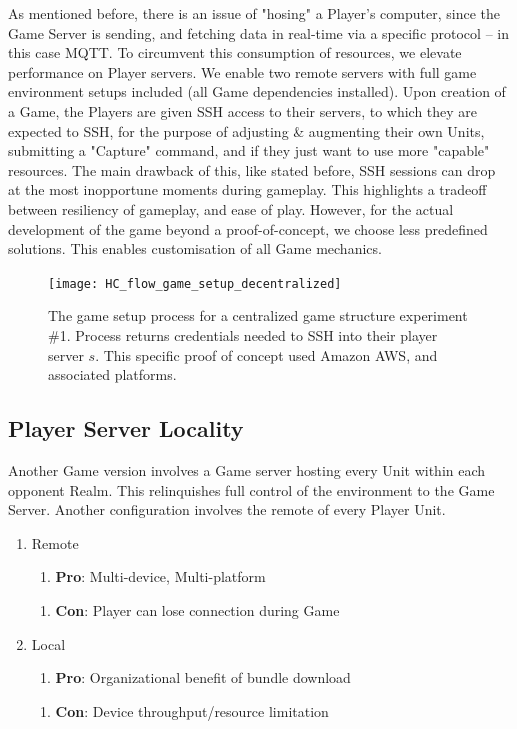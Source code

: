 \documentclass[10pt, titlepage, twocolumn]{article}
\newcommand{\ii}{\indent\indent}
\begin{document}
As mentioned before, there is an issue of "hosing" a Player's computer, since the Game Server is sending, and fetching data in real-time via a specific protocol -- in this case MQTT. To circumvent this consumption of resources, we elevate performance on Player servers. We enable two remote servers with full game environment setups included (all Game dependencies installed). Upon creation of a Game, the Players are given SSH access to their servers, to which they are expected to SSH, for the purpose of adjusting \& augmenting their own Units, submitting a "Capture" command, and if they just want to use more "capable" resources. The main drawback of this, like stated before, SSH sessions can drop at the most inopportune moments during gameplay. This highlights a tradeoff between resiliency of gameplay, and ease of play. However, for the actual development of the game beyond a proof-of-concept, we choose less predefined solutions. This enables customisation of all Game mechanics. 



\begin{figure}[ht]
\centering
	\texttt{[image: HC\_flow\_game\_setup\_decentralized]}
	\caption{The game setup process for a centralized game structure experiment \#1. Process returns credentials needed to SSH into their player server \(s\). This specific proof of concept used Amazon AWS, and associated platforms.}
	\label{decentralized}
\end{figure}



\subsection{Player Server Locality}
\ii
Another Game version involves a Game server hosting every Unit within each opponent Realm. This relinquishes full control of the environment to the Game Server. Another configuration involves the remote of every Player Unit.


\begin{enumerate}
	\item Remote
	\begin{enumerate}
		\item \textbf{Pro}: Multi-device, Multi-platform
	\end{enumerate}
	\begin{enumerate}
		\item \textbf{Con}: Player can lose connection during Game
	\end{enumerate}
	\item Local
	\begin{enumerate}
		\item \textbf{Pro}: Organizational benefit of bundle download
	\end{enumerate}
	\begin{enumerate}
		\item \textbf{Con}: Device throughput/resource limitation
	\end{enumerate}
\end{enumerate}
\end{document}

